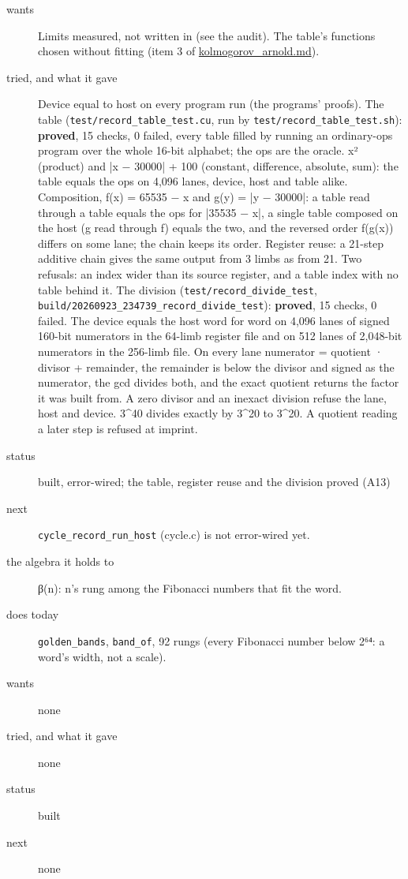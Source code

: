 \begin{description}
\item[{wants}] Limits measured, not written in (see the audit). The table's functions chosen without fitting (item 3 of \hyperref[chap:kolmogorov-arnold]{kolmogorov\_\allowbreak{}arnold.md}).
\item[{tried, and what it gave}] Device equal to host on every program run (the programs' proofs). The table (\texttt{test/\allowbreak{}record\_\allowbreak{}table\_\allowbreak{}test.\allowbreak{}cu}, run by \texttt{test/\allowbreak{}record\_\allowbreak{}table\_\allowbreak{}test.\allowbreak{}sh}): \textbf{proved}, 15 checks, 0 failed, every table filled by running an ordinary-ops program over the whole 16-bit alphabet; the ops are the oracle. x² (product) and |x − 30000| + 100 (constant, difference, absolute, sum): the table equals the ops on 4,096 lanes, device, host and table alike. Composition, f(x) = 65535 − x and g(y) = |y − 30000|: a table read through a table equals the ops for |35535 − x|, a single table composed on the host (g read through f) equals the two, and the reversed order f(g(x)) differs on some lane; the chain keeps its order. Register reuse: a 21-step additive chain gives the same output from 3 limbs as from 21. Two refusals: an index wider than its source register, and a table index with no table behind it. The division (\texttt{test/\allowbreak{}record\_\allowbreak{}divide\_\allowbreak{}test}, \texttt{build/\allowbreak{}20260923\_\allowbreak{}234739\_\allowbreak{}record\_\allowbreak{}divide\_\allowbreak{}test}): \textbf{proved}, 15 checks, 0 failed. The device equals the host word for word on 4,096 lanes of signed 160-bit numerators in the 64-limb register file and on 512 lanes of 2,048-bit numerators in the 256-limb file. On every lane numerator = quotient · divisor + remainder, the remainder is below the divisor and signed as the numerator, the gcd divides both, and the exact quotient returns the factor it was built from. A zero divisor and an inexact division refuse the lane, host and device. 3\textasciicircum{}40 divides exactly by 3\textasciicircum{}20 to 3\textasciicircum{}20. A quotient reading a later step is refused at imprint.
\item[{status}] built, error-wired; the table, register reuse and the division proved (A13)
\item[{next}] \texttt{cycle\_\allowbreak{}record\_\allowbreak{}run\_\allowbreak{}host} (cycle.c) is not error-wired yet.
\end{description}

\begin{description}
\item[{the algebra it holds to}] β(n): n's rung among the Fibonacci numbers that fit the word.
\item[{does today}] \texttt{golden\_\allowbreak{}bands}, \texttt{band\_\allowbreak{}of}, 92 rungs (every Fibonacci number below 2⁶⁴: a word's width, not a scale).
\item[{wants}] none
\item[{tried, and what it gave}] none
\item[{status}] built
\item[{next}] none
\end{description}

